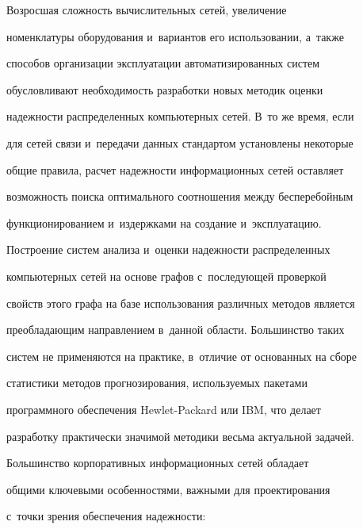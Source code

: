 \vspace*{-2pt}





   Возросшая сложность вычислительных сетей, увеличение 


номенклатуры обору\-дования и~вариантов его использовании, а~также 


способов организации эксплуатации автоматизированных систем 


обусловливают необходимость разработки новых методик оценки 


надежности распределенных компьютерных сетей. В~то же время, если 


для сетей связи и~передачи данных стандартом уста\-нов\-ле\-ны некоторые 


общие правила, расчет надежности информационных сетей оставляет 


возможность поиска оптимального соотношения между бесперебойным 


функционированием и~издержками на создание и~эксплуатацию.


   


   Построение систем анализа и~оценки надежности распределенных 


компьютерных сетей на основе графов с~последующей проверкой 


свойств этого графа на базе использования различных методов является 


преобладающим направлением в~данной области. Большинство таких 


систем не применяются на практике, в~отличие от основанных на сборе 


статистики методов прогнозирования, используемых пакетами 


программного обеспечения Hewlet-Packard или IBM, что делает 


разработку практически значимой методики весьма актуальной задачей.


   


   Большинство корпоративных информационных сетей обладает 


общими ключевыми особенностями, важными для проектирования 


с~точки зрения обеспечения надежности:


